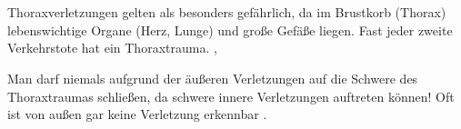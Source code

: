 \clearpage %
\section{}
\label{topic:thoraxtrauma}

\Text{\TxBeschreibung}
{%
%
Thoraxverletzungen gelten als besonders gefährlich, da im
Brustkorb (Thorax) lebenswichtige Organe (Herz,
Lunge) und große Gefäße liegen. Fast jeder zweite
Verkehrstote hat ein Thoraxtrauma. \cite{Gorgass7},
\cite{RedelsteinerHRNS1}
}

\begin{Danger}
  \item Man darf niemals aufgrund der äußeren Verletzungen auf
  die Schwere des Thoraxtraumas schließen, da schwere innere
  Verletzungen auftreten können! Oft ist von außen gar keine
  Verletzung erkennbar \cite{Strauss0000}.
\end{Danger}


